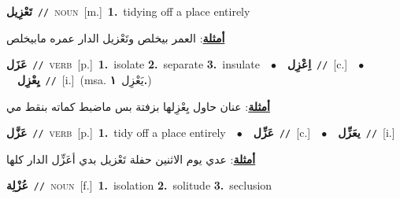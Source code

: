\documentclass[10pt,a4paper,twoside]{article} %
\begin{document}
\begin{multicols}{2}
{\setlength\topsep{0pt}\textbf{\foreignlanguage{arabic}{تَعْزِيل}}\ {\color{gray}\texttt{//}\color{black}}\ \textsc{noun}\ [m.]\ \textbf{1.}~tidying off a place entirely\  \begin{flushright}\color{gray}\foreignlanguage{arabic}{\textbf{\underline{\foreignlanguage{arabic}{أمثلة}}}: العمر بيخلص وتَعْزيل الدار عمره مابيخلص}\end{flushright}\color{black}} \vspace{2mm}

{\setlength\topsep{0pt}\textbf{\foreignlanguage{arabic}{عَزَل}}\ {\color{gray}\texttt{//}\color{black}}\ \textsc{verb}\ [p.]\ \textbf{1.}~isolate  \textbf{2.}~separate  \textbf{3.}~insulate\ \ $\bullet$\ \ \setlength\topsep{0pt}\textbf{\foreignlanguage{arabic}{اِعْزِل}}\ {\color{gray}\texttt{//}\color{black}}\ [c.]\ \ $\bullet$\ \ \setlength\topsep{0pt}\textbf{\foreignlanguage{arabic}{يِعْزِل}}\ {\color{gray}\texttt{//}\color{black}}\ [i.]\ \color{gray}(msa. \foreignlanguage{arabic}{يَعْزِل}~\foreignlanguage{arabic}{\textbf{١.}})\color{black}\  \begin{flushright}\color{gray}\foreignlanguage{arabic}{\textbf{\underline{\foreignlanguage{arabic}{أمثلة}}}: عنان حاول يِعْزِلها بزفتة بس ماضبط كماته بنقط مي}\end{flushright}\color{black}} \vspace{2mm}

{\setlength\topsep{0pt}\textbf{\foreignlanguage{arabic}{عَزَّل}}\ {\color{gray}\texttt{//}\color{black}}\ \textsc{verb}\ [p.]\ \textbf{1.}~tidy off a place entirely\ \ $\bullet$\ \ \setlength\topsep{0pt}\textbf{\foreignlanguage{arabic}{عَزِّل}}\ {\color{gray}\texttt{//}\color{black}}\ [c.]\ \ $\bullet$\ \ \setlength\topsep{0pt}\textbf{\foreignlanguage{arabic}{يعَزِّل}}\ {\color{gray}\texttt{//}\color{black}}\ [i.]\  \begin{flushright}\color{gray}\foreignlanguage{arabic}{\textbf{\underline{\foreignlanguage{arabic}{أمثلة}}}: عدي يوم الاثنين حفلة تَعْزيل بدي أعَزِّل الدار كلها}\end{flushright}\color{black}} \vspace{2mm}

{\setlength\topsep{0pt}\textbf{\foreignlanguage{arabic}{عُزْلِة}}\ {\color{gray}\texttt{//}\color{black}}\ \textsc{noun}\ [f.]\ \textbf{1.}~isolation  \textbf{2.}~solitude  \textbf{3.}~seclusion\ } \vspace{2mm}


\end{multicols}
\end{document}
